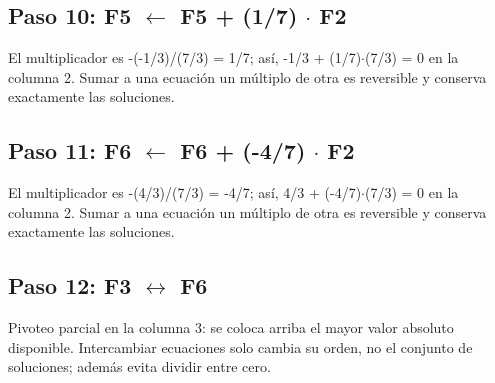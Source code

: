 \documentclass[conference]{IEEEtran}
\begin{document}
\medskip
\subsection*{Paso 10: F5 \(\leftarrow\) F5 + (1/7) \(\cdot\) F2}
El multiplicador es -(-1/3)/(7/3) = 1/7; así, -1/3 + (1/7)\(\cdot\)(7/3) = 0 en la columna 2. Sumar a una ecuación un múltiplo de otra es reversible y conserva exactamente las soluciones.


\medskip
\subsection*{Paso 11: F6 \(\leftarrow\) F6 + (-4/7) \(\cdot\) F2}
El multiplicador es -(4/3)/(7/3) = -4/7; así, 4/3 + (-4/7)\(\cdot\)(7/3) = 0 en la columna 2. Sumar a una ecuación un múltiplo de otra es reversible y conserva exactamente las soluciones.


\medskip
\subsection*{Paso 12: F3 \(\leftrightarrow\) F6}
Pivoteo parcial en la columna 3: se coloca arriba el mayor valor absoluto disponible. Intercambiar ecuaciones solo cambia su orden, no el conjunto de soluciones; además evita dividir entre cero.
\end{document}
